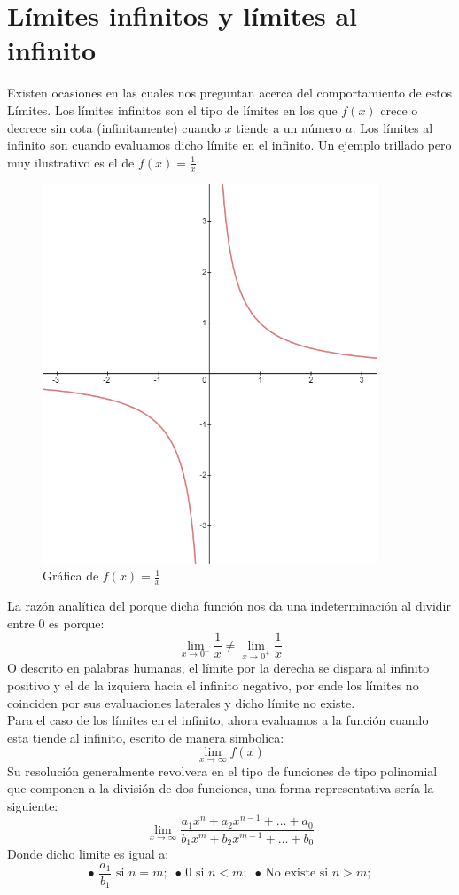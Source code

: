 \documentclass[letterpaper, 12pt]{article}
\begin{document}
    \section{Límites infinitos y límites al infinito}
    Existen ocasiones en las cuales nos preguntan acerca del comportamiento de estos Límites. Los límites infinitos son el tipo de límites en los que \(f(x)\) crece o decrece sin cota (infinitamente) cuando \(x\) tiende a un número \(a\). Los límites al infinito son cuando evaluamos
    dicho límite en el infinito. Un ejemplo trillado pero muy ilustrativo es el de \(f(x)=\frac{1}{x}\):
    \begin{figure}[H]
        \centering
        \includegraphics[width=10cm]{unosobrex.PNG}
        \caption{Gráfica de \(f(x)=\frac{1}{x}\)}
    \end{figure}
    La razón analítica del porque dicha función nos da una indeterminación al dividir entre 0 es porque:
    \[\lim_{x\rightarrow 0^-}\frac{1}{x}\neq \lim_{x\rightarrow 0^+}\frac{1}{x}\]
    O descrito en palabras humanas, el límite por la derecha se dispara al infinito positivo y el de la izquiera hacia el infinito negativo, por ende los límites no coinciden por sus evaluaciones laterales y dicho límite no existe.
    \\\newline
    Para el caso de los límites en el infinito, ahora evaluamos a la función cuando esta tiende al infinito, escrito de manera simbolica:
    \[\lim_{x \rightarrow \infty}f(x)\]
    Su resolución generalmente revolvera en el tipo de funciones de tipo polinomial que componen a la división de dos funciones, una forma representativa sería la siguiente:
    \[\lim_{x \rightarrow \infty}\frac{a_1x^n+a_2x^{n-1}+\dots+a_0}{b_1x^m+b_2x^{m-1}+\dots+b_0}\]
    Donde dicho limite es igual a:
    \[\text{• }\frac{a_1}{b_1}\text{ si }n=m;\, \text{ • }0\text{ si }n<m;\, \text{ • No existe si }n>m;\]
\end{document}
